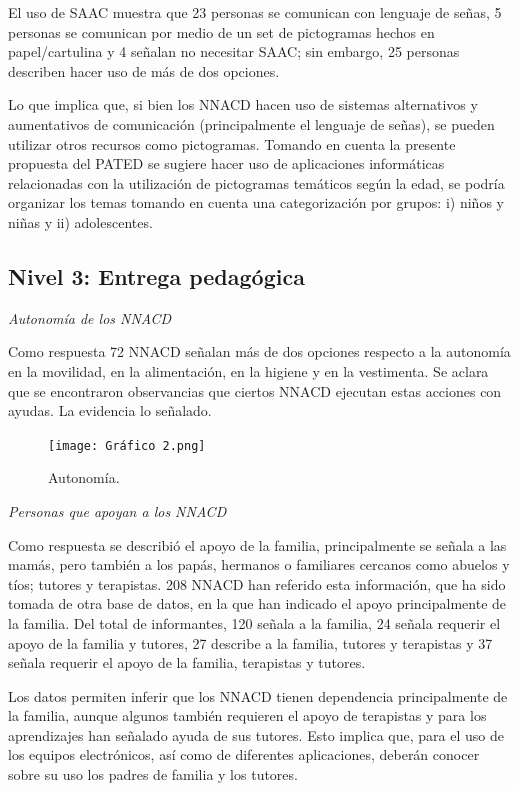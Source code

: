 \documentclass[spanish]{textolivre}
\begin{document}
El uso de SAAC muestra que 23 personas se comunican con lenguaje de señas, 5 personas se comunican por medio de un set de pictogramas hechos en papel/cartulina y 4 señalan no necesitar SAAC; sin embargo, 25 personas describen hacer uso de más de dos opciones.  

Lo que implica que, si bien los NNACD hacen uso de sistemas alternativos y aumentativos de comunicación (principalmente el lenguaje de señas), se pueden utilizar otros recursos como pictogramas. Tomando en cuenta la presente propuesta del PATED se sugiere hacer uso de aplicaciones informáticas relacionadas con la utilización de pictogramas temáticos según la edad, se podría organizar los temas tomando en cuenta una categorización por grupos: i) niños y niñas y ii) adolescentes.

\subsection{Nivel 3: Entrega pedagógica}\label{sec-modelo}
\textit{Autonomía de los NNACD}

Como respuesta 72 NNACD señalan más de dos opciones respecto a la autonomía en la movilidad, en la alimentación, en la higiene y en la vestimenta. Se aclara que se encontraron observancias que ciertos NNACD ejecutan estas acciones con ayudas. La  evidencia lo señalado.

\begin{figure}[h!]
 \centering
 \texttt{[image: Gráfico 2.png]}
 \caption{Autonomía.}
 \label{fig03}
\end{figure}

\textit{Personas que apoyan a los NNACD}

Como respuesta se describió el apoyo de la familia, principalmente se señala a las mamás, pero también a los papás, hermanos o familiares cercanos como abuelos y tíos; tutores y terapistas. 208 NNACD han referido esta información, que ha sido tomada de otra base de datos, en la que han indicado el apoyo principalmente de la familia. Del total de informantes, 120 señala a la familia, 24 señala requerir el apoyo de la familia y tutores, 27 describe a la familia, tutores y terapistas y 37 señala requerir el apoyo de la familia, terapistas y tutores.

Los datos permiten inferir que los NNACD tienen dependencia principalmente de la familia, aunque algunos también requieren el apoyo de terapistas y para los aprendizajes han señalado ayuda de sus tutores. Esto implica que, para el uso de los equipos electrónicos, así como de diferentes aplicaciones, deberán conocer sobre su uso los padres de familia y los tutores.
\end{document}
